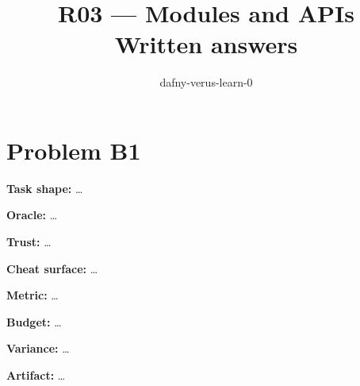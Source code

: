 \documentclass[11pt]{article}
\title{R03 --- Modules and APIs \\ \large Written answers}
\author{dafny-verus-learn-0}
\date{}
\begin{document}
\maketitle
\section*{Problem B1}\label{ans:B1}
\begin{answer}
\textbf{Task shape:} \dots

\textbf{Oracle:} \dots

\textbf{Trust:} \dots

\textbf{Cheat surface:} \dots

\textbf{Metric:} \dots

\textbf{Budget:} \dots

\textbf{Variance:} \dots

\textbf{Artifact:} \dots
\end{answer}
\end{document}
